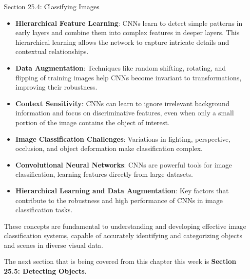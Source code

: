 \begin{notes}{Section 25.4: Classifying Images}
    \begin{highlight}
    
        \begin{itemize}
            \item \textbf{Hierarchical Feature Learning}: CNNs learn to detect simple patterns in early layers and combine them into complex features in deeper layers. This hierarchical learning allows 
            the network to capture intricate details and contextual relationships.
            \item \textbf{Data Augmentation}: Techniques like random shifting, rotating, and flipping of training images help CNNs become invariant to transformations, improving their robustness.
            \item \textbf{Context Sensitivity}: CNNs can learn to ignore irrelevant background information and focus on discriminative features, even when only a small portion of the image contains the 
            object of interest.
        \end{itemize}
    
    \end{highlight}
    
    \begin{highlight}
    
        \begin{itemize}
            \item \textbf{Image Classification Challenges}: Variations in lighting, perspective, occlusion, and object deformation make classification complex.
            \item \textbf{Convolutional Neural Networks}: CNNs are powerful tools for image classification, learning features directly from large datasets.
            \item \textbf{Hierarchical Learning and Data Augmentation}: Key factors that contribute to the robustness and high performance of CNNs in image classification tasks.
        \end{itemize}
    
        These concepts are fundamental to understanding and developing effective image classification systems, capable of accurately identifying and categorizing objects and scenes in diverse visual data.
    
    \end{highlight}
\end{notes}

The next section that is being covered from this chapter this week is \textbf{Section 25.5: Detecting Objects}.


